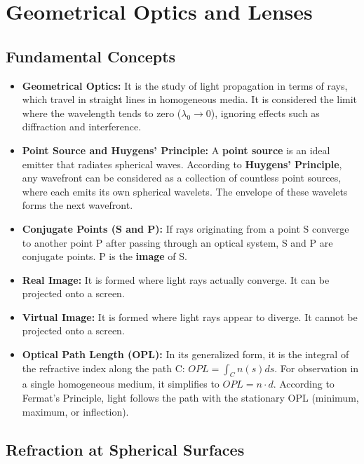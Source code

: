 \chapter{Geometrical Optics and Lenses}

\section{Fundamental Concepts}
\begin{itemize}
    \item \textbf{Geometrical Optics:} It is the study of light propagation in terms of rays, which travel in straight lines in homogeneous media. It is considered the limit where the wavelength tends to zero ($\lambda_0 \to 0$), ignoring effects such as diffraction and interference.
    \item \textbf{Point Source and Huygens' Principle:} A \textbf{point source} is an ideal emitter that radiates spherical waves. According to \textbf{Huygens' Principle}, any wavefront can be considered as a collection of countless point sources, where each emits its own spherical wavelets. The envelope of these wavelets forms the next wavefront.
    \item \textbf{Conjugate Points (S and P):} If rays originating from a point S converge to another point P after passing through an optical system, S and P are conjugate points. P is the \textbf{image} of S.
    \item \textbf{Real Image:} It is formed where light rays actually converge. It can be projected onto a screen.
    \item \textbf{Virtual Image:} It is formed where light rays appear to diverge. It cannot be projected onto a screen.
    \item \textbf{Optical Path Length (OPL):} In its generalized form, it is the integral of the refractive index along the path C: $OPL = \int_C n(s) ds$. For observation in a single homogeneous medium, it simplifies to $OPL = n \cdot d$. According to Fermat's Principle, light follows the path with the stationary OPL (minimum, maximum, or inflection).
\end{itemize}

\section{Refraction at Spherical Surfaces}

